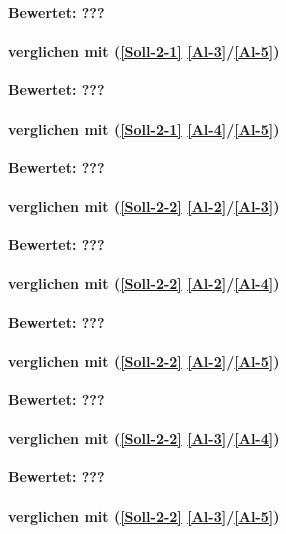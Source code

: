 \textbf{Bewertet: ???}

\paragraph*{  verglichen mit  (\ref{Soll-2-1} \ref{Al-3}/\ref{Al-5})}

\textbf{Bewertet: ???}


\paragraph*{  verglichen mit  (\ref{Soll-2-1} \ref{Al-4}/\ref{Al-5})}

\textbf{Bewertet: ???}


\paragraph*{  verglichen mit  (\ref{Soll-2-2} \ref{Al-2}/\ref{Al-3})}

\textbf{Bewertet: ???}

\paragraph*{  verglichen mit  (\ref{Soll-2-2} \ref{Al-2}/\ref{Al-4})}

\textbf{Bewertet: ???}

\paragraph*{  verglichen mit  (\ref{Soll-2-2} \ref{Al-2}/\ref{Al-5})}

\textbf{Bewertet: ???}

\paragraph*{  verglichen mit  (\ref{Soll-2-2} \ref{Al-3}/\ref{Al-4})}

\textbf{Bewertet: ???}

\paragraph*{  verglichen mit  (\ref{Soll-2-2} \ref{Al-3}/\ref{Al-5})}


